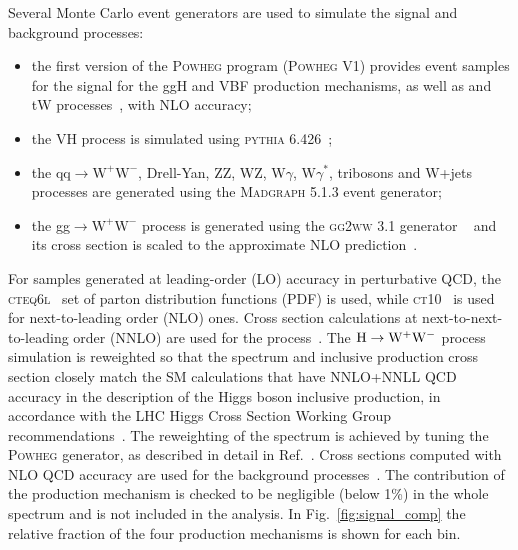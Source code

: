 Several Monte Carlo event generators are used to simulate the signal and background processes:
\begin{itemize}
\item the first version of the \textsc{Powheg} program (\textsc{Powheg V1}) provides event samples for the \hww signal
for the ggH and VBF production mechanisms, as well as \ttbar and tW processes~\cite{Alioli:2011as}, with NLO accuracy;
\item the VH process is simulated using \textsc{pythia 6.426}~\cite{Sjostrand:2006za};
\item the $\mathrm{qq} \to \mathrm{W^{+}W^{-}}$, Drell-Yan, ZZ, WZ, W$\gamma$, W$\gamma^*$, tribosons and W+jets processes are generated using
the \textsc{Madgraph 5.1.3} event generator;
\item the gg$\to \mathrm{W^{+}W^{-}}$ process is generated using the \textsc{gg2ww} 3.1 generator ~\cite{Binoth:2006mf} and its cross section is scaled to the approximate NLO prediction~\cite{Bonvini:2013jha,Passarino:2013bha}.
\end{itemize}
For samples generated at leading-order (LO) accuracy in perturbative QCD, the \textsc{cteq6l}~\cite{Lai:2010nw} set of parton distribution functions
(PDF) is used, while \textsc{ct10}~\cite{Lai:2010vv} is used for next-to-leading order (NLO) ones.
Cross section calculations at next-to-next-to-leading order (NNLO) are used for the \hww process~\cite{Dittmaier:2011ti}.
The ${\mathrm{H}\to\mathrm{W^+W^-}}$ process simulation is reweighted so that the \pth spectrum and inclusive production cross section closely match the SM calculations that have NNLO+NNLL QCD accuracy in the description of the Higgs boson inclusive production, in accordance with the LHC Higgs Cross Section Working Group recommendations~\cite{Heinemeyer:2013tqa}.
The reweighting of the \pth spectrum is achieved by tuning the \textsc{Powheg} generator, as described in detail in Ref.~\cite{Alioli:2010xd}.
Cross sections computed with NLO QCD accuracy are used for the background processes~\cite{Heinemeyer:2013tqa}.
The contribution of the \ttH production mechanism is checked to be negligible (below 1\%) in the whole \pth spectrum and is not included in the analysis. In Fig.~\ref{fig:signal_comp} the relative fraction of the four production mechanisms is shown for each \pth bin.


